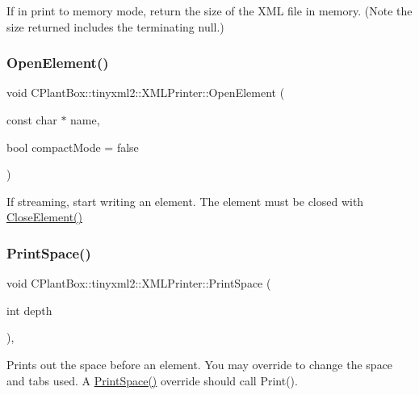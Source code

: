 If in print to memory mode, return the size of the X\+ML file in memory. (Note the size returned includes the terminating null.) \mbox{\label{classCPlantBox_1_1tinyxml2_1_1XMLPrinter_aa797e20ece518c0e53b41150f6529cd8}} 
\subsubsection{\texorpdfstring{Open\+Element()}{OpenElement()}}
{\footnotesize\ttfamily void C\+Plant\+Box\+::tinyxml2\+::\+X\+M\+L\+Printer\+::\+Open\+Element (\begin{DoxyParamCaption}\item[{const char $\ast$}]{name,  }\item[{bool}]{compact\+Mode = {\ttfamily false} }\end{DoxyParamCaption})}

If streaming, start writing an element. The element must be closed with \hyperlink{classCPlantBox_1_1tinyxml2_1_1XMLPrinter_ac3c57a5a4b0b87a649a75206361b3e57}{Close\+Element()} \mbox{\label{classCPlantBox_1_1tinyxml2_1_1XMLPrinter_a0c59d58a53aa6ed55609e831df4a9ae5}} 
\subsubsection{\texorpdfstring{Print\+Space()}{PrintSpace()}}
{\footnotesize\ttfamily void C\+Plant\+Box\+::tinyxml2\+::\+X\+M\+L\+Printer\+::\+Print\+Space (\begin{DoxyParamCaption}\item[{int}]{depth }\end{DoxyParamCaption})\hspace{0.3cm}{\ttfamily [protected]}, {\ttfamily [virtual]}}

Prints out the space before an element. You may override to change the space and tabs used. A \hyperlink{classCPlantBox_1_1tinyxml2_1_1XMLPrinter_a0c59d58a53aa6ed55609e831df4a9ae5}{Print\+Space()} override should call Print(). \mbox{\label{classCPlantBox_1_1tinyxml2_1_1XMLPrinter_a25cb903976aa0a0c6c0d11c8b57eba4c}} 
